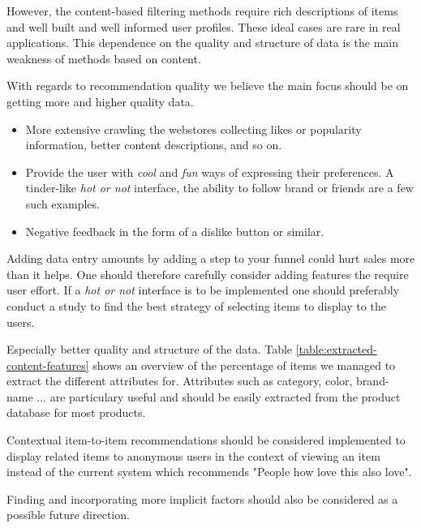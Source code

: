 However, the content-based filtering methods require rich descriptions of items
and well built and well informed user profiles. These ideal cases are rare in
real applications. This dependence on the quality and structure of data is the
main weakness of methods based on content.

With regards to recommendation quality we believe the main focus should be on
getting more and higher quality data.

\begin{itemize}
\item More extensive crawling the webstores collecting likes or popularity information, better content descriptions,
	  and so on.
\item Provide the user with \emph{cool} and \emph{fun} ways of expressing their preferences. A tinder-like \emph{hot or not}
	  interface, the ability to follow brand or friends are a few such examples.
\item Negative feedback in the form of a dislike button or similar.
\end{itemize}

Adding data entry amounts by adding a step to your funnel could hurt sales more than it helps. One should
therefore carefully consider adding features the require user effort. If a \emph{hot or not} interface is to be implemented
one should preferably conduct a study to find the best strategy of selecting items to display to the users.

Especially better quality and structure of the data. Table \ref{table:extracted-content-features} shows an overview of
the percentage of items we managed to extract the different attributes for. Attributes such as category, color, brand-name ...
are particulary useful and should be easily extracted from the product database for most products.


Contextual item-to-item recommendations should be considered implemented to display related
items to anonymous users in the context of viewing an item instead of the current system which
recommends "People how love this also love".




Finding and incorporating more implicit factors should also be considered as a possible future direction.

